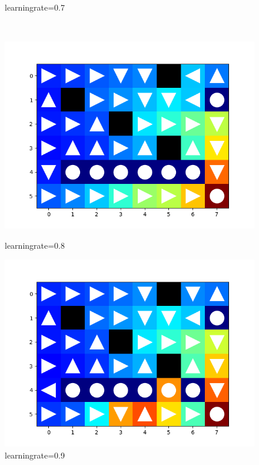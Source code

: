 \documentclass[aps,letterpaper,10pt]{revtex4}
\begin{document}
\begin{enumerate}
\begin{figure}[htbp]
\begin{minipage}[t]{0.5\linewidth}
            \caption{learningrate=0.7} 
            \end{minipage}%
            \\
            \centering 
            \begin{minipage}[t]{0.5\linewidth}
            \centering 
            \includegraphics[scale=0.5]{ql_e_greedy.png} 
            \caption{learningrate=0.8} 
            \end{minipage}%
            \begin{minipage}[t]{0.5\linewidth} 
            \centering 
            \includegraphics[scale=0.5]{a=9.png} 
            \caption{learningrate=0.9} 
            \end{minipage}%

\end{figure}
\end{enumerate}
\end{document}
